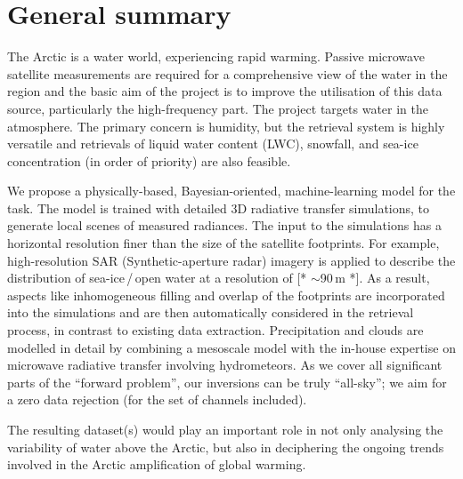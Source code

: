 \documentclass[12pt,oneside,a4paper]{article}
\newcommand\intodo[1]{{\color{red} [* #1 *]}}
\begin{document}
	
	
	\thispagestyle{empty}
	\vspace*{-10mm}
	\noindent
	\textbf{\Large \LongTitle}




\section{General summary}
%
The Arctic is a water world, experiencing rapid warming. Passive microwave
satellite measurements are required for a comprehensive view of the water in the region and the basic aim of the project is to improve the utilisation of this data source, particularly the high-frequency part. The project targets water in the atmosphere. The primary concern is humidity, but
the retrieval system is highly versatile and retrievals of liquid water  content (LWC), snowfall, and sea-ice concentration (in order of priority) are also
feasible.

We propose a physically-based, Bayesian-oriented, machine-learning model for
the task. The model is trained with detailed 3D radiative transfer simulations,
to generate local scenes of measured radiances. The input to the simulations
has a horizontal resolution finer than the size of the satellite footprints.
For example, high-resolution SAR (Synthetic-aperture radar) imagery is applied to describe the
distribution of sea-ice\,/\,open water at a resolution of \intodo{$\sim$90\,m}. As a result,
aspects like inhomogeneous filling and overlap of the footprints are
incorporated into the simulations and are then automatically considered in the
retrieval process, in contrast to existing data extraction. Precipitation and
clouds are modelled in detail by combining a mesoscale model with the in-house
expertise on microwave radiative transfer involving hydrometeors. As we cover
all significant parts of the ``forward problem'', our inversions can be truly
``all-sky''; we aim for a zero data rejection (for the set of channels
included).

The resulting dataset(s) would play an important role in not only analysing the
variability of water above the Arctic, but also in deciphering the
ongoing trends involved in the Arctic amplification of global warming.
\end{document}

